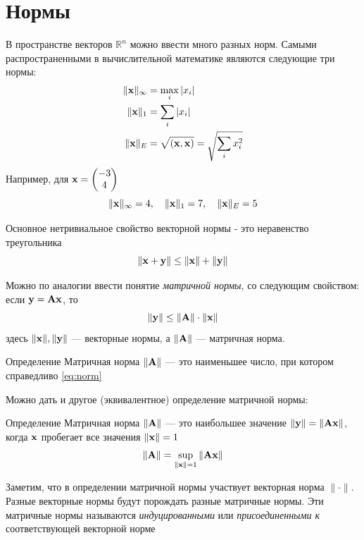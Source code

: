 \documentclass[professionalfonts,compress,unicode]{beamer}
\begin{document}
\section{Нормы}
{
	В пространстве векторов $\mathbb{R}^n$ можно ввести много разных норм. 
	Самыми распространенными в вычислительной математике являются 
	следующие три нормы:
	\begin{align*}
	\|{\bf x}\|_\infty &= \max_i |x_i|\\
	\|{\bf x}\|_1 &= \sum_i |x_i|\\
	\|{\bf x}\|_E &= \sqrt{({\bf x},{\bf x})} = \sqrt{\sum_i x_i^2}\\
	\end{align*}
	\pause
	Например, для ${\bf x} = \begin{pmatrix}
		-3\\4
	\end{pmatrix}$
	$$
	\|{\bf x}\|_\infty = 4, \quad
	\|{\bf x}\|_1 = 7, \quad
	\|{\bf x}\|_E = 5
	$$
}

{
	Основное нетривиальное свойство векторной нормы - это неравенство треугольника
	$$
	\|{\bf x} + {\bf y}\| \leq \|{\bf x}\| + \|{\bf y}\|
	$$
	
	Можно по аналогии ввести понятие \emph{матричной нормы}, со следующим свойством: если ${\bf y} = {\bf A}{\bf x}$, то
	\begin{equation}
	\| {\bf y}\| \leq \|{\bf A}\| \cdot \|{\bf x}\|
	\label{eq:norm}
	\end{equation}
	здесь $\| {\bf x}\|,\| {\bf y}\|$ --- векторные нормы, а $\|{\bf A}\|$ --- матричная норма. 
	\begin{block}{Определение}
	Матричная норма $\|{\bf A}\|$ --- это наименьшее число, при котором справедливо \eqref{eq:norm}
	\end{block}
}

{
	Можно дать и другое (эквивалентное) определение матричной нормы:
	\begin{block}{Определение}
	Матричная норма $\|{\bf A}\|$ --- это наибольшее значение $\|{\bf y}\| = \|{\bf A}{\bf x}\|$, когда ${\bf x}$ пробегает все значения
	$\|{\bf x}\| = 1$
	$$
	\|{\bf A}\| = \sup_{\|{\bf x}\| = 1} \|{\bf A}{\bf x}\|
	$$
	\end{block}
	Заметим, что в определении матричной нормы участвует векторная норма $\|\cdot\|$. Разные векторные нормы будут порождать
	разные матричные нормы. Эти матричные нормы называются \emph{индуцированными} или \emph{присоединенными к} 
	соответствующей векторной норме
}
\end{document}
